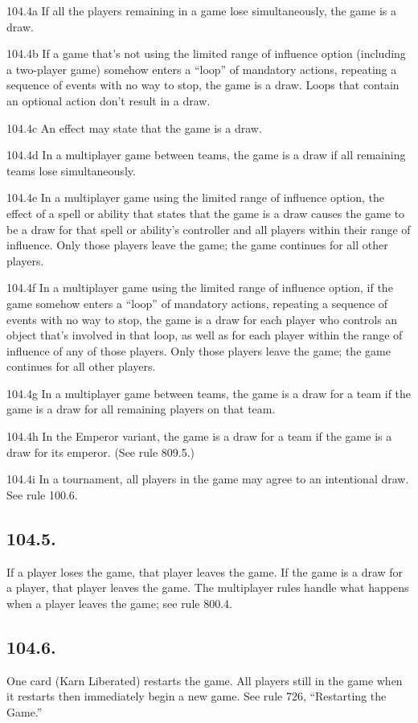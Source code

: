 104.4a If all the players remaining in a game lose simultaneously, the game is a draw.

104.4b If a game that’s not using the limited range of influence option (including a two-player game) somehow enters a “loop” of mandatory actions, repeating a sequence of events with no way to stop, the game is a draw. Loops that contain an optional action don’t result in a draw.

104.4c An effect may state that the game is a draw.

104.4d In a multiplayer game between teams, the game is a draw if all remaining teams lose simultaneously.

104.4e In a multiplayer game using the limited range of influence option, the effect of a spell or ability that states that the game is a draw causes the game to be a draw for that spell or ability’s controller and all players within their range of influence. Only those players leave the game; the game continues for all other players.

104.4f In a multiplayer game using the limited range of influence option, if the game somehow enters a “loop” of mandatory actions, repeating a sequence of events with no way to stop, the game is a draw for each player who controls an object that’s involved in that loop, as well as for each player within the range of influence of any of those players. Only those players leave the game; the game continues for all other players.

104.4g In a multiplayer game between teams, the game is a draw for a team if the game is a draw for all remaining players on that team.

104.4h In the Emperor variant, the game is a draw for a team if the game is a draw for its emperor. (See rule 809.5.)

104.4i In a tournament, all players in the game may agree to an intentional draw. See rule 100.6.

\subsection*{104.5.}
If a player loses the game, that player leaves the game. If the game is a draw for a player, that player leaves the game. The multiplayer rules handle what happens when a player leaves the game; see rule 800.4.

\subsection*{104.6.}
One card (Karn Liberated) restarts the game. All players still in the game when it restarts then immediately begin a new game. See rule 726, “Restarting the Game.”

